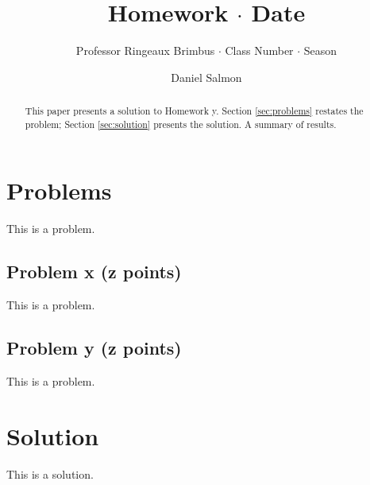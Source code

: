 \documentclass[manuscript,screen,nonacm]{acmart}
\theoremstyle{plain}
\theoremstyle{remark}
\theoremstyle{definition}
\begin{document}
\title{Homework $\cdot$ Date}
\subtitle{Professor Ringeaux Brimbus $\cdot$ Class Number $\cdot$ Season}

\author{Daniel Salmon}

\begin{abstract}
	This paper presents a solution to Homework y.  Section
	\ref{sec:problems} restates the problem; Section \ref{sec:solution}
	presents the solution. A summary of results.
\end{abstract}

\maketitle

\section{Problems}
\label{sec:problems}

This is a problem.

\subsection{Problem x (z points)}
\label{subsec:problemx}

This is a problem.

\subsection{Problem y (z points)}
\label{subsec:problemy}

This is a problem.

\section{Solution}
\label{sec:solution}

This is a solution.
\end{document}

